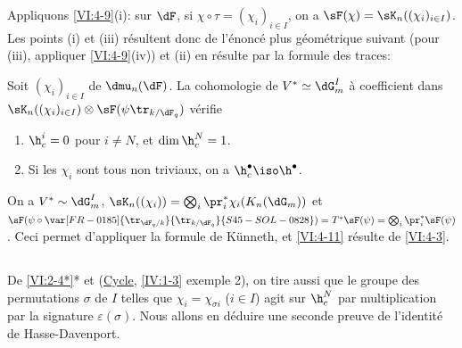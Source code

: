 Appliquons \ref{VI:4-9}(i): sur $\dF$, si $\chi\circ \tau=(\chi_i)_{i\in I}$, 
on a $\sF(\chi) = \sK_n((\chi_i)_{i\in I})$. Les points (i) et (iii) 
résultent donc de l'énoncé plus géométrique suivant (pour (iii), 
appliquer \ref{VI:4-9}(iv)) et (ii) en résulte par la formule des traces: 





\begin{proposition_}\label{VI:4-11}
Soit $(\chi_i)_{i\in I}$  de $\dmu_n(\dF)$. La 
cohomologie de $V^\ast\simeq \dG_m^I$ à coefficient dans 
$\sK_n((\chi_i)_{i\in I})\otimes \sF(\psi\tr_{k/\dF_q})$ vérifie 
\begin{enumerate}[\indent (i)]
  \item $\h_c^i{}=0$ pour $i\ne N$, et $\dim \h_c^N{} = 1$. 
  \item Si les $\chi_i$ sont tous non triviaux, on a 
    $\h_c^\bullet{}\iso \h^\bullet$. 
\end{enumerate}
\end{proposition_}

On a $V^\ast\sim \dG_m^I$, 
$\sK_n((\chi_i)) = \bigotimes_i \pr_i^\ast \chi_i(K_n(\dG_m))$ et 
$\sF(\psi\circ \var[FR-0185]{\tr_{\dF_q/k}}{\tr_{k/\dF_q}}{S45-SOL-0828})=T^\ast \sF(\psi) = \bigotimes_i \pr_i^\ast \sF(\psi)$. 
Ceci permet d'appliquer la formule de K\"unneth, et \ref{VI:4-11} résulte de 
\ref{VI:4-3}. 





\subsection{}\label{VI:4-12}

De \ref{VI:2-4*}* et (\hyperref[IV]{Cycle}, \ref{IV:1-3} exemple 2), on tire 
aussi que le groupe des permutations $\sigma$ de $I$ telles que 
$\chi_i = \chi_{\sigma i}$ ($i\in I$) agit sur $\h_c^N$ par multiplication par 
la signature $\varepsilon(\sigma)$. Nous allons en déduire une seconde preuve 
de l'identité de Hasse-Davenport. 

